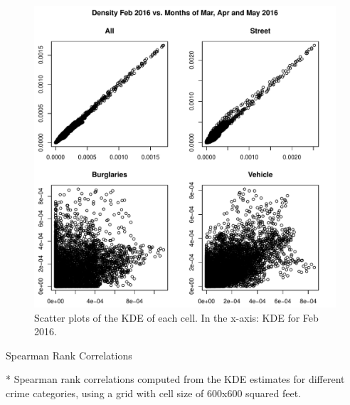 \documentclass[12pt,letterpaper]{article}
\theoremstyle{plain}
\theoremstyle{plain}
\theoremstyle{definition}
\theoremstyle{remark}
\begin{document}
\begin{figure}[h!]
    \centering
    \includegraphics[]{figures/scatter_kde_3m.pdf}
    \caption{Scatter plots of the KDE of each cell. In the x-axis: KDE for Feb 2016.}
    \label{fig:figure1}
\end{figure}

\begin{table}[h!]
    \centering
    \caption{Spearman Rank Correlations}
    \begin{threeparttable}
         
        \begin{tablenotes}\footnotesize
        \item[*] Spearman rank correlations computed from the KDE estimates for different crime categories, using a grid with cell size of 600x600 squared feet.
        \end{tablenotes}
    \end{threeparttable}
\end{table}
\end{document}
